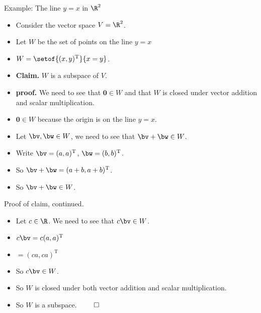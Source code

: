 \documentclass{beamer}
\begin{document}
\begin{frame}{Example: The line $y=x$ in $\R^2$}

\begin{itemize}
\item Consider the vector space $V = \R^2$.
\item Let $W$ be the set of points on the line $y=x$
\item $W=\setof{(x,y)^{\text{T}}}{x=y}$.
\item \textbf{Claim.} $W$ is a subspace of $V$.
\item \textbf{proof.} We need to see that $\textbf{0}\in W$ and that
$W$ is closed under vector
addition and scalar multiplication.
\item $\textbf{0} \in W$ because the origin is on the line $y=x$.
\item Let $\bv,\bw\in W$, we need to see that $\bv+\bw\in W$.
\item Write $\bv=(a,a)^{\text{T}}$, $\bw = (b,b)^{\text{T}}$.
\item So $\bv+\bw = (a+b,a+b)^{\text{T}}$.
\item So $\bv+\bw \in W$.
\end{itemize}
\end{frame}


\begin{frame}{Proof of claim, continued.}

\begin{itemize}
\item Let $c\in \R$. We need to see that $c \bv\in W$.
\item $c\bv = c(a,a)^{\text{T}}$
\item $=(ca,ca)^{\text{T}}$
\item So $c\bv\in W$.
\item So $W$ is closed under both vector addition and scalar multiplication.
\item So $W$ is a subspace. $\qed$
\end{itemize}
\end{frame}
\end{document}

